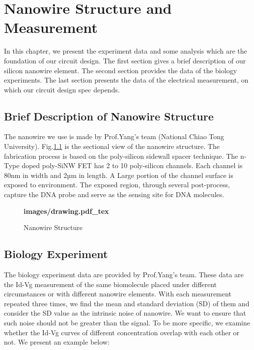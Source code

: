 \chapter{Nanowire Structure and Measurement}
In this chapter, we present the experiment data and some analysis which are the foundation of our circuit design.
The first section gives a brief description of our silicon nanowire element.
The second section provides the data of the biology experiments.
The last section presents the data of the electrical measurement, on which our circuit design spec depends.

\section{Brief Description of Nanowire Structure}
The nanowire we use is made by Prof.Yang's team (National Chiao Tong University)\cite{C5}.
Fig.\ref{fig:drawing} is the sectional view of the nanowire structure.
The fabrication process is based on the poly-silicon sidewall spacer technique.
The n-Type doped poly-SiNW FET has 2 to 10 poly-silicon channels.
Each channel is 80nm in width and 2µm in length.
A Large portion of the channel surface is exposed to environment.
The exposed region, through several post-process, capture the DNA probe and serve as the sensing site for DNA molecules.\cite{C5, C6}

\begin{figure}[!htbp]
    \centering
    {\selectfont\textbf{
        \def\svgwidth{5.0cm}
        \fontsize{6}{7}\selectfont
         {images/drawing.pdf_tex}
    }}
    \fontsize{6}{7}\selectfont
    \caption{Nanowire Structure}
    \label{fig:drawing}
\end{figure}


\section{Biology Experiment}
The biology experiment data are provided by Prof.Yang's team.
These data are the Id-Vg measurement of the same biomolecule placed under different circumstances or with different nanowire elements.
With each measurement repeated three times, we find the mean and standard deviation (SD) of them and consider the SD value as the intrinsic noise of nanowire.
We want to ensure that such noise should not be greater than the signal.
To be more specific, we examine whether the Id-Vg curves of different concentration overlap with each other or not.
We present an example below:

